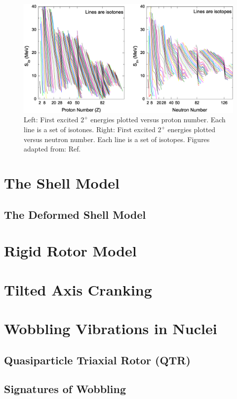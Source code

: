 \begin{figure}
\label{fig:chp2-two-plus-energies}
\centerline{\includegraphics[height=0.3\textheight]{./img/c2/2nuc_sep_en.eps}}
	\caption{Left: First excited $2^+$ energies plotted versus proton number. Each line is a set of isotones. Right: First excited $2^+$ energies plotted versus neutron number. Each line is a set of isotopes. Figures adapted from: Ref.\cite{RamanTwoPlus}}
\end{figure}

\section{The Shell Model}
\label{sec:models-shell-model}
\subsection{The Deformed Shell Model}
\label{ssec:models-shell-model-def-sm}
\section{Rigid Rotor Model}
\label{sec:models-rigid-rotor}

\section{Tilted Axis Cranking}
\label{sec:models-tac}

\section{Wobbling Vibrations in Nuclei}
\label{sec:models-wobbling}
\subsection{Quasiparticle Triaxial Rotor (QTR)}
\label{sec:models-qtr}
\subsection{Signatures of Wobbling}
\label{sec:models-sig}
